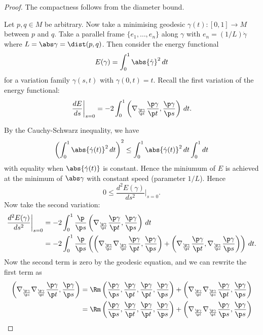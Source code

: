 \begin{proof}
  The compactness follows from the diameter bound.

  Let $p,q \in M$ be arbitrary.
  Now take a minimising geodesic $\gamma(t):[0,1]\to M$ between $p$ and $q$.
  Take a parallel frame $\{e_1,\ldots,e_n\}$ along $\gamma$ with $e_n=(1/L)\dot\gamma$ where $L=\abs\gamma=\dist(p,q)$.
  Then consider the energy functional
  \[ E(\gamma) = \int_0^1 \abs{\dot\gamma}^2\,dt \]
  for a variation family $\gamma(s,t)$ with $\gamma(0,t)=t$.
  Recall the first variation of the energy functional:
  \[ \frac{dE}{ds}\bigg\vert_{s=0} = -2\int_0^1 \left( \nabla_{\frac{\p\gamma}{\p t}}\frac{\p\gamma}{\p t}, \frac{\p\gamma}{\p s} \right)\,dt. \]

  By the Cauchy-Schwarz inequality, we have
  \[ \left( \int_0^1 \abs{\dot\gamma(t)}^2\,dt \right)^2 \leq \int_0^1 \abs{\dot\gamma(t)}^2\,dt \int_0^1dt \]
  with equality when $\abs{\dot\gamma(t)}$ is constant.
  Hence the miniumum of $E$ is achieved at the minimum of $\abs\gamma$ with constant speed (parameter $1/L$).
  Hence
  \[ 0 \leq \frac{d^2E(\gamma)}{ds^2}\bigg\vert_{s=0}. \]
  Now take the second variation:
  \begin{align*}
    \frac{d^2E(\gamma)}{ds^2}\bigg\vert_{s=0} &= -2 \int_0^1 \frac{\p}{\p s} \left( \nabla_{\frac{\p\gamma}{\p t}}\frac{\p\gamma}{\p t}, \frac{\p\gamma}{\p s} \right)\,dt \\
    &= -2 \int_0^1 \frac{\p}{\p s} \left( \left( \nabla_{\frac{\p\gamma}{\p s}}\nabla_{\frac{\p\gamma}{\p t}}\frac{\p\gamma}{\p t}, \frac{\p\gamma}{\p s} \right) + \left( \nabla_{\frac{\p\gamma}{\p t}}\frac{\p\gamma}{\p t}, \nabla_{\frac{\p\gamma}{\p s}}\frac{\p\gamma}{\p s} \right) \right)\,dt.
  \end{align*}
  Now the second term is zero by the geodesic equation, and we can rewrite the first term as
  \begin{align*}
    \left( \nabla_{\frac{\p\gamma}{\p s}}\nabla_{\frac{\p\gamma}{\p t}}\frac{\p\gamma}{\p t}, \frac{\p\gamma}{\p s} \right) &= \Rm\left( \frac{\p\gamma}{\p s}, \frac{\p\gamma}{\p t}, \frac{\p\gamma}{\p t}, \frac{\p\gamma}{\p s} \right) + \left( \nabla_{\frac{\p\gamma}{\p t}}\nabla_{\frac{\p\gamma}{\p s}}\frac{\p\gamma}{\p t}, \frac{\p\gamma}{\p s} \right) \\
    &= \Rm\left( \frac{\p\gamma}{\p s}, \frac{\p\gamma}{\p t}, \frac{\p\gamma}{\p t}, \frac{\p\gamma}{\p s} \right) + \left( \nabla_{\frac{\p\gamma}{\p t}}\nabla_{\frac{\p\gamma}{\p t}}\frac{\p\gamma}{\p s}, \frac{\p\gamma}{\p s} \right)

\end{align*}
\end{proof}
